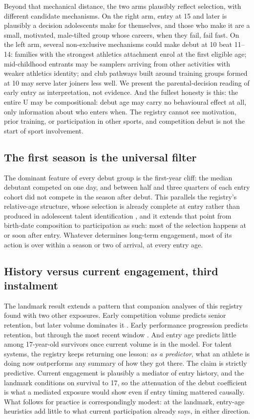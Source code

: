 \documentclass[12pt,a4paper]{article}
\begin{document}
Beyond that mechanical distance, the two arms plausibly reflect selection, with different candidate mechanisms. On the right arm, entry at 15 and later is plausibly a decision adolescents make for themselves, and those who make it are a small, motivated, male-tilted group whose careers, when they fail, fail fast. On the left arm, several non-exclusive mechanisms could make debut at 10 beat 11--14: families with the strongest athletics attachment enrol at the first eligible age; mid-childhood entrants may be samplers arriving from other activities with weaker athletics identity; and club pathways built around training groups formed at 10 may serve later joiners less well. We present the parental-decision reading of early entry as interpretation, not evidence. And the fullest honesty is this: the entire U may be compositional: debut age may carry no behavioural effect at all, only information about who enters when. The registry cannot see motivation, prior training, or participation in other sports, and competition debut is not the start of sport involvement.

\subsection{The first season is the universal filter}

The dominant feature of every debut group is the first-year cliff: the median debutant competed on one day, and between half and three quarters of each entry cohort did not compete in the season after debut. This parallels the registry's relative-age structure, whose selection is already complete at entry rather than produced in adolescent talent identification \cite{guttormsen2026rae}, and it extends that point from birth-date composition to participation as such: most of the selection happens at or soon after entry. Whatever determines long-term engagement, most of its action is over within a season or two of arrival, at every entry age.

\subsection{History versus current engagement, third instalment}

The landmark result extends a pattern that companion analyses of this registry found with two other exposures. Early competition volume predicts senior retention, but later volume dominates it \cite{guttormsen2026dropout}. Early performance progression predicts retention, but through the most recent window \cite{guttormsen2026progression}. And entry age predicts little among 17-year-old survivors once current volume is in the model. For talent systems, the registry keeps returning one lesson: \emph{as a predictor}, what an athlete is doing now outperforms any summary of how they got there. The claim is strictly predictive. Current engagement is plausibly a mediator of entry history, and the landmark conditions on survival to 17, so the attenuation of the debut coefficient is what a mediated exposure would show even if entry timing mattered causally. What follows for practice is correspondingly modest: at the landmark, entry-age heuristics add little to what current participation already says, in either direction.
\end{document}
